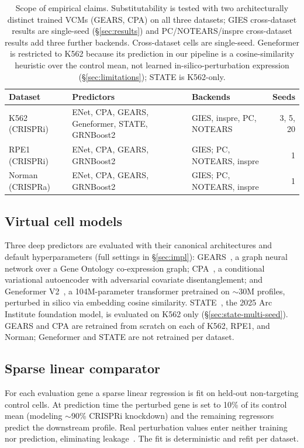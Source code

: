 \documentclass{article}
\theoremstyle{plain}
\theoremstyle{definition}
\theoremstyle{remark}
\begin{document}
\begin{table}[t]
\centering
\small
\begin{tabular}{l p{6.1cm} l r}
\toprule
\textbf{Dataset} & \textbf{Predictors} & \textbf{Backends} & \textbf{Seeds} \\
\midrule
K562 (CRISPRi)   & ENet, CPA, GEARS, Geneformer, STATE, GRNBoost2 & GIES, inspre, PC, NOTEARS & 3, 5, 20 \\
RPE1 (CRISPRi)   & ENet, CPA, GEARS, GRNBoost2                    & GIES; PC, NOTEARS, inspre & 1 \\
Norman (CRISPRa) & ENet, CPA, GEARS, GRNBoost2                    & GIES; PC, NOTEARS, inspre & 1 \\
\bottomrule
\end{tabular}
\caption{Scope of empirical claims. Substitutability is tested with two architecturally distinct trained VCMs (GEARS, CPA) on all three datasets; GIES cross-dataset results are single-seed (\S\ref{sec:results}) and PC/NOTEARS/inspre cross-dataset results add three further backends. Cross-dataset cells are single-seed. Geneformer is restricted to K562 because its prediction in our pipeline is a cosine-similarity heuristic over the control mean, not learned in-silico-perturbation expression (\S\ref{sec:limitations}); STATE is K562-only.}
\label{tab:scope}
\end{table}

\subsection{Virtual cell models}
Three deep predictors are evaluated with their canonical architectures and default hyperparameters (full settings in \S\ref{sec:impl}): GEARS~\citep{roohani2024gears}, a graph neural network over a Gene Ontology co-expression graph; CPA~\citep{lotfollahi2023cpa}, a conditional variational autoencoder with adversarial covariate disentanglement; and Geneformer V2~\citep{theodoris2023geneformer}, a 104M-parameter transformer pretrained on $\sim$30M profiles, perturbed in silico via embedding cosine similarity. STATE~\citep{adduri2025state,arc2025state}, the 2025 Arc Institute foundation model, is evaluated on K562 only (\S\ref{sec:state-multi-seed}). GEARS and CPA are retrained from scratch on each of K562, RPE1, and Norman; Geneformer and STATE are not retrained per dataset.

\subsection{Sparse linear comparator}
For each evaluation gene a sparse linear regression is fit on held-out non-targeting control cells. At prediction time the perturbed gene is set to 10\% of its control mean (modeling $\sim$90\% CRISPRi knockdown) and the remaining regressors predict the downstream profile. Real perturbation values enter neither training nor prediction, eliminating leakage~\citep{zou2005elasticnet}. The fit is deterministic and refit per dataset.
\end{document}
